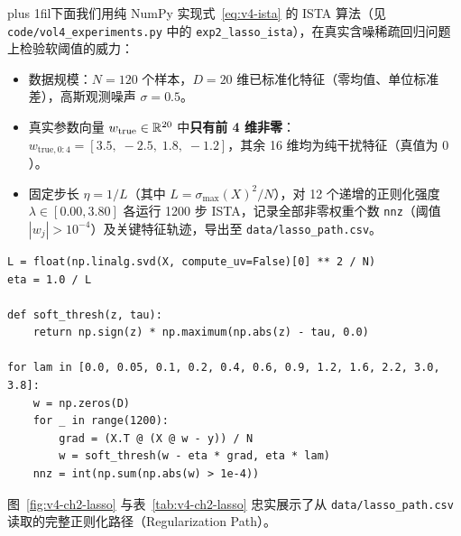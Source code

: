 {\rightskip=0pt plus 1fil\relax 下面我们用纯 NumPy 实现式~\eqref{eq:v4-ista} 的 ISTA 算法（见 \texttt{code/vol4\_experiments.py} 中的 \texttt{exp2\_lasso\_ista}），在真实含噪稀疏回归问题上检验软阈值的威力：\par}
\begin{itemize}
  \item 数据规模：$N = 120$ 个样本，$D = 20$ 维已标准化特征（零均值、单位标准差），高斯观测噪声 $\sigma = 0.5$。
  \item 真实参数向量 $w_{\text{true}} \in \mathbb{R}^{20}$ 中\textbf{只有前 4 维非零}：$w_{\text{true}, 0:4} = [3.5,\; -2.5,\; 1.8,\; -1.2]$，其余 16 维均为纯干扰特征（真值为 $0$）。
  \item 固定步长 $\eta = 1/L$（其中 $L = \sigma_{\max}(X)^2/N$），对 12 个递增的正则化强度 $\lambda \in [0.00, 3.80]$ 各运行 1200 步 ISTA，记录全部非零权重个数 \texttt{nnz}（阈值 $|w_j| > 10^{-4}$）及关键特征轨迹，导出至 \texttt{data/lasso\_path.csv}。
\end{itemize}

\begin{lstlisting}[caption={纯 NumPy 实现近端梯度 ISTA 追踪 Lasso 路径（节选自 \texttt{vol4\_experiments.py}）},label={lst:v4-ch2-ista}]
L = float(np.linalg.svd(X, compute_uv=False)[0] ** 2 / N)
eta = 1.0 / L

def soft_thresh(z, tau):
    return np.sign(z) * np.maximum(np.abs(z) - tau, 0.0)

for lam in [0.0, 0.05, 0.1, 0.2, 0.4, 0.6, 0.9, 1.2, 1.6, 2.2, 3.0, 3.8]:
    w = np.zeros(D)
    for _ in range(1200):
        grad = (X.T @ (X @ w - y)) / N
        w = soft_thresh(w - eta * grad, eta * lam)
    nnz = int(np.sum(np.abs(w) > 1e-4))
\end{lstlisting}

图~\ref{fig:v4-ch2-lasso} 与表~\ref{tab:v4-ch2-lasso} 忠实展示了从 \texttt{data/lasso\_path.csv} 读取的完整正则化路径（Regularization Path）。

